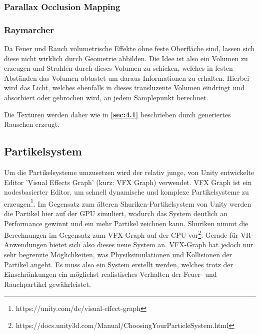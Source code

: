 \subsubsection{Parallax Occlusion Mapping}


\subsubsection{Raymarcher}

Da Feuer und Rauch volumetrische Effekte ohne feste Oberfläche sind, lassen sich diese nicht wirklich durch Geometrie abbilden. Die Idee ist also ein
Volumen zu erzeugen und Strahlen durch dieses Volumen zu schicken, welches in festen Abständen das Volumen abtastet um daraus Informationen zu erhalten.
Hierbei wird das Licht, welches ebenfalls in dieses transluzente Volumen eindringt und absorbiert oder gebrochen wird, an jedem Samplepunkt berechnet.

Die Texturen werden daher wie in \textbf{\autoref{sec:4.1}} beschrieben durch generiertes Rauschen erzeugt.



\subsection{Partikelsystem}
Um die Partikelsysteme umzusetzen wird der relativ junge, von Unity entwickelte Editor 'Visual Effects Graph'
(kurz: VFX Graph) verwendet. VFX Graph ist ein nodesbasierter Editor, um schnell
dynamische und komplexe Partikelsysteme zu erzeugen\footnote{https://unity.com/de/visual-effect-graph}.
Im Gegensatz zum älteren Shuriken-Partikelsystem von Unity werden die Partikel hier auf der GPU
simuliert, wodurch das System deutlich an Performance gewinnt und ein mehr Partikel zeichnen kann.
Shuriken nimmt die Berechnungen im Gegensatz zum VFX Graph auf der CPU vor\footnote{https://docs.unity3d.com/Manual/ChoosingYourParticleSystem.html}.
Gerade für VR-Anwendungen bietet sich also dieses neue System an.
VFX-Graph hat jedoch nur sehr begrenzte Möglichkeiten, was Physiksimulationen und Kollisionen der Partikel angeht.
Es muss also ein System erstellt werden, welches trotz der Einschränkungen ein möglichst realistisches
Verhalten der Feuer- und Rauchpartikel gewährleistet.




\newpage
